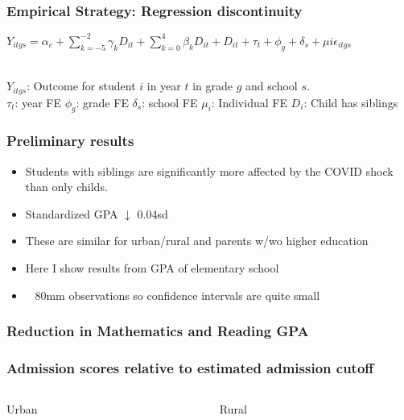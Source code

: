 \documentclass{beamer}
\begin{document}
\begin{frame}
    \frametitle{Empirical Strategy: Regression discontinuity}
    
    $Y_{itgs}=\alpha_{c} + \sum_{k=-5}^{-2}   \gamma_k D_{it} + \sum_{k=0}^{4} \beta_k D_{it} + D_{it}  + \tau_{t} + \phi_{g} + \delta_{s} + \mu{i} \epsilon_{itgs}$ 
   
    
    \bigskip \\
    $Y_{itgs}$: Outcome for student $i$ in year $t$ in grade $g$ and school $s$. \\
    $\tau_{t}$: year FE
    $\phi_{g}$: grade FE
    $\delta_{s}$: school FE
    $\mu_{i}$: Individual FE
    $D_{i} $: Child has siblings
    
\end{frame}

\begin{frame}
    \frametitle{Preliminary results}
    \begin{itemize}
        \item Students with siblings are significantly more affected by the COVID shock than only childs.
        \item Standardized GPA $\downarrow$ 0.04sd
        \item These are similar for urban/rural and parents w/wo higher education
        \item Here I show results from GPA of elementary school
        \item ~ 80mm observations so confidence intervals are quite small
    \end{itemize}
\end{frame}



\begin{frame}
    \label{overall_gpa}
    \frametitle{Reduction in Mathematics and Reading GPA}
        {
  }  
\end{frame}


\begin{frame}
\frametitle{Admission scores relative to estimated admission cutoff}

\begin{columns}[T]
\begin{column}{.5\textwidth}
Urban
{
  }

\end{column}
\hfill
\begin{column}{.5\textwidth}
Rural
{
  }
\end{column}
\end{columns}
\end{frame}
\end{document}
